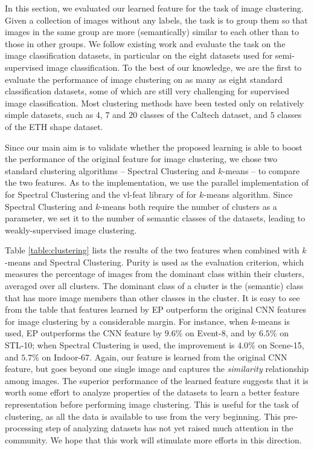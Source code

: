 \documentclass[preprint,12pt,3p]{elsarticle}
\begin{document}
In this section, we evaluated our learned feature for the task of
image clustering. Given a collection of images without any labels, the
task is to group them so that images in the same group are more
(semantically) similar to each other than to those in other groups.
We follow existing work \citep{Sivic05b,
  Tuytelaars_UnsupervisedSurvey, dai, dai:eccv12b, fakton:eccv12} and
evaluate the task on the image classification datasets, in particular 
on the eight datasets used for semi-supervised image
classification.  To the best of our knowledge, we are the first
to evaluate the performance of image clustering on as many as eight
standard classification datasets, some of which are still very
challenging for supervised image classification. 
Most clustering methods have been tested only on relatively simple
datasets, such as $4$, $7$ and $20$ classes of the Caltech dataset,
and $5$ classes of the ETH shape dataset.

Since our main aim is to validate whether the proposed learning is
able to boost the performance of the original feature for image
clustering, we chose two standard clustering algorithms -- Spectral
Clustering and $k$-means -- to compare the two features.  As to the
implementation, we use the parallel implementation of
\citep{parallel:sc} for Spectral Clustering and the vl-feat library of
\citep{vlfeat} for $k$-means algorithm.  Since Spectral
Clustering and $k$-means both require the number of clusters
as a parameter, we set it to the number of semantic classes of the datasets, leading to
weakly-supervised image clustering. 

Table \ref{table:clustering} lists the results of the two features
when combined with $k$-means and Spectral Clustering.  Purity is used
as the evaluation criterion, which measures the percentage of images
from the dominant class within their clusters, averaged over all
clusters. The dominant class of a cluster is the (semantic) class that
has more image members than other classes in the cluster.  It is easy
to see from the table that features learned by EP outperform the
original CNN features for image clustering by a considerable
margin. For instance, when $k$-means is used, EP outperforms the CNN
feature by $9.6\%$ on Event-8, and by $6.5\%$ on STL-10; when Spectral
Clustering is used, the improvement is $4.0\%$ on Scene-15, and
$5.7\%$ on Indoor-67.  Again, our feature is learned from the original
CNN feature, but goes beyond one single image and captures the
\emph{similarity} relationship among images. The superior performance
of the learned feature suggests that it is worth some effort to
analyze properties of the datasets to learn a better feature
representation before performing image clustering. This is useful for the task of clustering, as all the data is
available to use from the very beginning. This pre-processing step of
analyzing datasets has not yet raised much attention in the community. We
hope that this work will stimulate more efforts in this direction.
\end{document}
